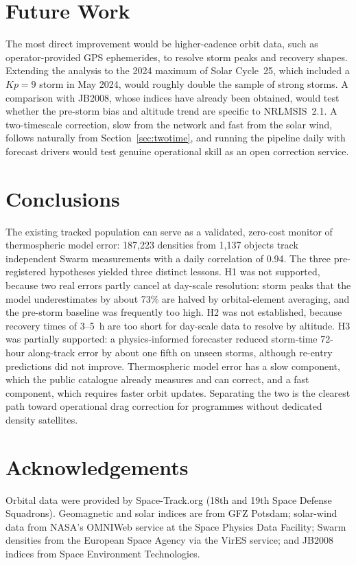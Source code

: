 \documentclass[11pt]{article}
\newcommand{\Kp}{\mathit{Kp}}
\begin{document}
\section{Future Work}
The most direct improvement would be higher-cadence orbit data, such as operator-provided GPS ephemerides, to resolve storm peaks and recovery shapes. Extending the analysis to the 2024 maximum of Solar Cycle~25, which included a $\Kp = 9$ storm in May 2024, would roughly double the sample of strong storms. A comparison with JB2008, whose indices have already been obtained, would test whether the pre-storm bias and altitude trend are specific to NRLMSIS~2.1. A two-timescale correction, slow from the network and fast from the solar wind, follows naturally from Section~\ref{sec:twotime}, and running the pipeline daily with forecast drivers would test genuine operational skill as an open correction service.

\section{Conclusions}
The existing tracked population can serve as a validated, zero-cost monitor of thermospheric model error: 187,223 densities from 1,137 objects track independent Swarm measurements with a daily correlation of 0.94. The three pre-registered hypotheses yielded three distinct lessons. H1 was not supported, because two real errors partly cancel at day-scale resolution: storm peaks that the model underestimates by about 73\% are halved by orbital-element averaging, and the pre-storm baseline was frequently too high. H2 was not established, because recovery times of 3--5~h are too short for day-scale data to resolve by altitude. H3 was partially supported: a physics-informed forecaster reduced storm-time 72-hour along-track error by about one fifth on unseen storms, although re-entry predictions did not improve. Thermospheric model error has a slow component, which the public catalogue already measures and can correct, and a fast component, which requires faster orbit updates. Separating the two is the clearest path toward operational drag correction for programmes without dedicated density satellites.

\section*{Acknowledgements}
Orbital data were provided by Space-Track.org (18th and 19th Space Defense Squadrons). Geomagnetic and solar indices are from GFZ Potsdam; solar-wind data from NASA's OMNIWeb service at the Space Physics Data Facility; Swarm densities from the European Space Agency via the VirES service; and JB2008 indices from Space Environment Technologies.
\end{document}
